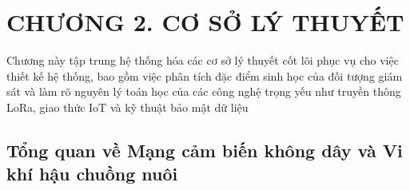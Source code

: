 

\section*{CHƯƠNG 2. CƠ SỞ LÝ THUYẾT}
\setcounter{section}{2}
\setcounter{subsection}{0}
\setcounter{figure}{0}
\setcounter{table}{0}

Chương này tập trung hệ thống hóa các cơ sở lý thuyết cốt lõi phục vụ cho việc thiết kế hệ thống, bao gồm việc phân tích đặc điểm sinh học của đối tượng giám sát và làm rõ nguyên lý toán học của các công nghệ trọng yếu như truyền thông LoRa, giao thức IoT và kỹ thuật bảo mật dữ liệu

\subsection{Tổng quan về Mạng cảm biến không dây và Vi khí hậu chuồng nuôi}
